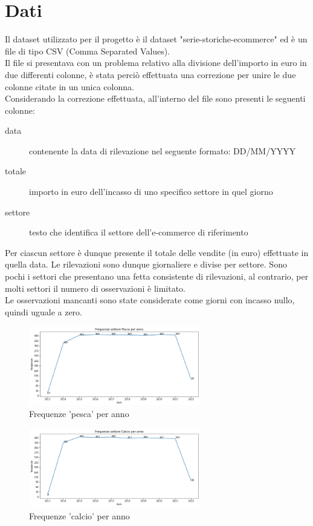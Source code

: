 \documentclass[12pt, a4paper, twocolumn]{article} %
\begin{document}
\section{Dati}
Il dataset utilizzato per il progetto è il dataset "serie-storiche-ecommerce" ed è un file di tipo CSV (Comma Separated Values).\\
Il file si presentava con un problema relativo alla divisione dell'importo in euro in due differenti colonne, è stata perciò effettuata una correzione per unire le due colonne citate in un unica colonna.\\
Considerando la correzione effettuata, all'interno del file sono presenti le seguenti colonne:
\begin{description}
	\item[data] contenente la data di rilevazione nel seguente formato: DD/MM/YYYY
	\item[totale] importo in euro dell'incasso di uno specifico settore in quel giorno
	\item[settore] testo che identifica il settore dell'e-commerce di riferimento
\end{description}
Per ciascun settore è dunque presente il totale delle vendite (in euro) effettuate in quella data. Le rilevazioni sono dunque giornaliere e divise per settore. Sono pochi i settori che presentano una fetta consistente di rilevazioni, al contrario, per molti settori il numero di osservazioni è limitato.\\
Le osservazioni mancanti sono state considerate come giorni con incasso nullo, quindi uguale a zero.
\begin{figure}[H]
  \caption{Frequenze 'pesca' per anno}
  \begin{center}
    \includegraphics[width=75mm,scale=0.5]{frequenze-pesca.png}
  \end{center}
\end{figure}
\begin{figure}[H]
  \caption{Frequenze 'calcio' per anno}
  \begin{center}
    \includegraphics[width=75mm,scale=0.5]{frequenze-calcio.png}
  \end{center}
\end{figure}
\end{document}

